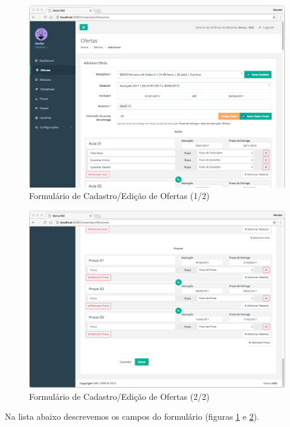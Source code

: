 \begin{figure}[H]
\centering
     \includegraphics[width=1.0\textwidth]{Screens/OffersForm.png}
      \caption{Formulário de Cadastro/Edição de Ofertas (1/2)}
       \label{fig:scOfferForm}
\end{figure}

\begin{figure}[H]
\centering
     \includegraphics[width=1.0\textwidth]{Screens/OffersForm2.png}
      \caption{Formulário de Cadastro/Edição de Ofertas (2/2)}
       \label{fig:scOfferForm2}
\end{figure}

Na lista abaixo descrevemos os campos do formulário (figuras \hyperref[fig:scOfferForm]{\ref{fig:scOfferForm}} e \hyperref[fig:scOfferForm2]{\ref{fig:scOfferForm2}}).

